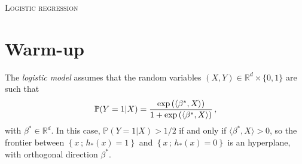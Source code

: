 \documentclass[a4paper,10pt,fleqn]{article}
\newcommand{\eqsp}{\,}
\newcommand{\rset}{\ensuremath{\mathbb{R}}}
\newcommand{\bP}{\mathbb{P}}
\newcommand{\1}{\ensuremath{\mathbbm{1}}}
\begin{document}

\noindent\hrulefill

\begin{center}
\textsc{Logistic regression}
\end{center}
\hrulefill

\medskip



\section{Warm-up}
The \emph{logistic model} assumes that the random variables  $(X,Y)\in \rset^d\times\{0,1\}$ are such that
$$
\bP(Y=1|X)={\exp\left(\langle \beta^*,X\rangle\right)\over 1+\exp\left(\langle \beta^*,X\rangle\right)}\eqsp,
$$
with $\beta^*\in\mathbb{R}^d$. In this case,  $\bP(Y=1|X)>1/2$ if and only if $\langle \beta^*,X\rangle>0$, so
the frontier between $\left\{x\eqsp;\eqsp h_{*}(x)=1\right\}$ and $\left\{x\eqsp ;\eqsp h_{*}(x)=0\right\}$ is an hyperplane, with orthogonal
direction $\beta^*$. 
\end{document}
